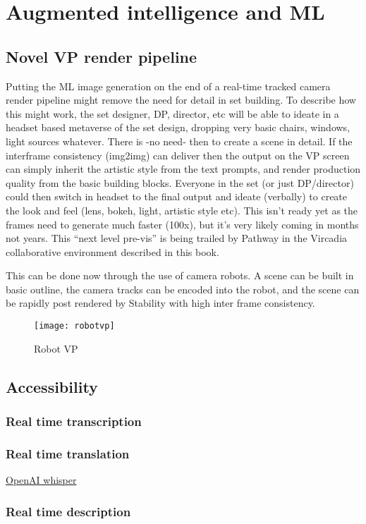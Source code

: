 \section{Augmented intelligence and ML}
\subsection{Novel VP render pipeline}
Putting the ML image generation on the end of a real-time tracked camera render pipeline might remove the need for detail in set building. To describe how this might work, the set designer, DP, director, etc will be able to ideate in a headset based metaverse of the set design, dropping very basic chairs, windows, light sources whatever. There is -no need- then to create a scene in detail. If the interframe consistency (img2img) can deliver then the output on the VP screen can simply inherit the artistic style from the text prompts, and render production quality from the basic building blocks. Everyone in the set (or just DP/director) could then switch in headset to the final output and ideate (verbally) to create the look and feel (lens, bokeh, light, artistic style etc). This isn’t ready yet as the frames need to generate much faster (100x), but it’s very likely coming in months not years. This ``next level pre-vis'' is being trailed by Pathway in the Vircadia collaborative environment described in this book.\par
This can be done now through the use of camera robots. A scene can be built in basic outline, the camera tracks can be encoded into the robot, and the scene can be rapidly post rendered by Stability with high inter frame consistency.
\begin{figure}[ht]\centering 	\texttt{[image: robotvp]}
	\caption{Robot VP}
	\label{fig:robotvp}
\end{figure}
\subsection{Accessibility}
\subsubsection{Real time transcription}
\subsubsection{Real time translation}
\href{https://openai.com/blog/whisper/}{OpenAI whisper}
\subsubsection{Real time description}
